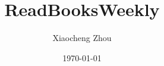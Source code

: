 \documentclass[working]{article}
\title{ReadBooksWeekly}
\author{Xiaocheng Zhou}
\date{\today}
\begin{document}
\maketitle







\listnotes

\end{document}
